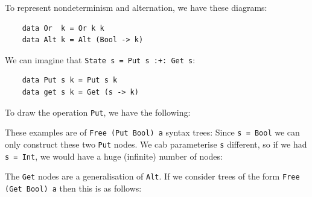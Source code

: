 \documentclass[a4paper,12pt]{article}
\theoremstyle{remark}
\begin{document}
To represent nondeterminism and alternation, we have these diagrams:

\begin{lstlisting}
    data Or  k = Or k k
    data Alt k = Alt (Bool -> k)  \end{lstlisting}

\begin{figure}[H]
  \centering
\end{figure}

We can imagine that \lstinline{State s = Put s :+: Get s}:

\begin{lstlisting}
    data Put s k = Put s k
    data get s k = Get (s -> k)  \end{lstlisting}

To draw the operation \lstinline{Put}, we have the following:

\begin{figure}[H]
  \centering
\end{figure}

These examples are of \lstinline{Free (Put Bool) a} syntax trees: Since
\lstinline{s = Bool} we can only construct these two \lstinline{Put} nodes.
We cab parameterise \lstinline{s} different, so if we had \lstinline{s = Int},
we would have a huge (infinite) number of nodes:
\begin{figure}[H]
  \centering
\end{figure}

The \lstinline{Get} nodes are a generalisation of \lstinline{Alt}. If we consider
trees of the form \lstinline{Free (Get Bool) a} then this is as follows:
\end{document}
